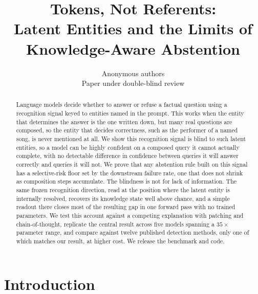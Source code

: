 \documentclass{article}
\title{Tokens, Not Referents:\\ Latent Entities and the Limits of\\ Knowledge-Aware Abstention}
\author{Anonymous authors\\Paper under double-blind review}
\begin{document}
\maketitle

\begin{abstract}
Language models decide whether to answer or refuse a factual question using a recognition signal keyed
to entities named in the prompt. This works when the entity that determines the answer is the one
written down, but many real questions are composed, so the entity that decides correctness, such as the
performer of a named song, is never mentioned at all. We show this recognition signal is blind to such
latent entities, so a model can be highly confident on a composed query it cannot actually complete,
with no detectable difference in confidence between queries it will answer correctly and queries it
will not. We prove that any abstention rule built on this signal has a selective-risk floor set by the
downstream failure rate, one that does not shrink as composition steps accumulate. The blindness is
not for lack of information. The same frozen recognition direction, read at the position where the
latent entity is internally resolved, recovers its knowledge state well above chance, and a simple
readout there closes most of the resulting gap in one forward pass with no trained parameters. We test
this account against a competing explanation with patching and chain-of-thought, replicate the central
result across five models spanning a $35\times$ parameter range, and compare against twelve
published detection methods, only one of which matches our result, at higher cost. We release the
benchmark and code.
\end{abstract}



\section{Introduction}
\end{document}
